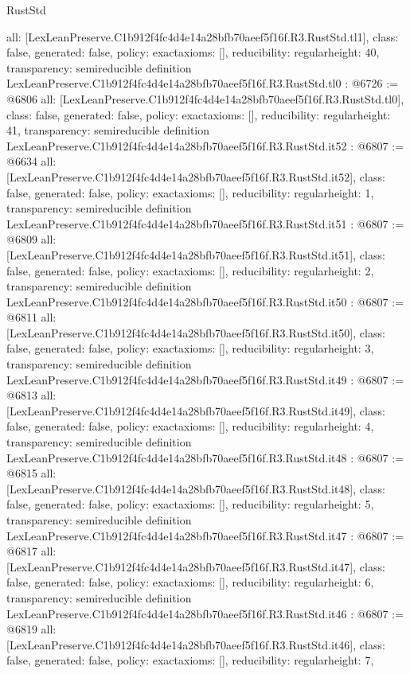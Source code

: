 \begin{lexlean}{RustStd}
\begin{coremodule}
{  all: [LexLeanPreserve.C1b912f4fc4d4e14a28bfb70aeef5f16f.R3.RustStd.tl1],
  class: false,
  generated: false,
  policy: exact{axioms: []},
  reducibility: regular{height: 40},
  transparency: semireducible
}
definition LexLeanPreserve.C1b912f4fc4d4e14a28bfb70aeef5f16f.R3.RustStd.tl0 : @6726 := @6806 {
  all: [LexLeanPreserve.C1b912f4fc4d4e14a28bfb70aeef5f16f.R3.RustStd.tl0],
  class: false,
  generated: false,
  policy: exact{axioms: []},
  reducibility: regular{height: 41},
  transparency: semireducible
}
definition LexLeanPreserve.C1b912f4fc4d4e14a28bfb70aeef5f16f.R3.RustStd.it52 : @6807 := @6634 {
  all: [LexLeanPreserve.C1b912f4fc4d4e14a28bfb70aeef5f16f.R3.RustStd.it52],
  class: false,
  generated: false,
  policy: exact{axioms: []},
  reducibility: regular{height: 1},
  transparency: semireducible
}
definition LexLeanPreserve.C1b912f4fc4d4e14a28bfb70aeef5f16f.R3.RustStd.it51 : @6807 := @6809 {
  all: [LexLeanPreserve.C1b912f4fc4d4e14a28bfb70aeef5f16f.R3.RustStd.it51],
  class: false,
  generated: false,
  policy: exact{axioms: []},
  reducibility: regular{height: 2},
  transparency: semireducible
}
definition LexLeanPreserve.C1b912f4fc4d4e14a28bfb70aeef5f16f.R3.RustStd.it50 : @6807 := @6811 {
  all: [LexLeanPreserve.C1b912f4fc4d4e14a28bfb70aeef5f16f.R3.RustStd.it50],
  class: false,
  generated: false,
  policy: exact{axioms: []},
  reducibility: regular{height: 3},
  transparency: semireducible
}
definition LexLeanPreserve.C1b912f4fc4d4e14a28bfb70aeef5f16f.R3.RustStd.it49 : @6807 := @6813 {
  all: [LexLeanPreserve.C1b912f4fc4d4e14a28bfb70aeef5f16f.R3.RustStd.it49],
  class: false,
  generated: false,
  policy: exact{axioms: []},
  reducibility: regular{height: 4},
  transparency: semireducible
}
definition LexLeanPreserve.C1b912f4fc4d4e14a28bfb70aeef5f16f.R3.RustStd.it48 : @6807 := @6815 {
  all: [LexLeanPreserve.C1b912f4fc4d4e14a28bfb70aeef5f16f.R3.RustStd.it48],
  class: false,
  generated: false,
  policy: exact{axioms: []},
  reducibility: regular{height: 5},
  transparency: semireducible
}
definition LexLeanPreserve.C1b912f4fc4d4e14a28bfb70aeef5f16f.R3.RustStd.it47 : @6807 := @6817 {
  all: [LexLeanPreserve.C1b912f4fc4d4e14a28bfb70aeef5f16f.R3.RustStd.it47],
  class: false,
  generated: false,
  policy: exact{axioms: []},
  reducibility: regular{height: 6},
  transparency: semireducible
}
definition LexLeanPreserve.C1b912f4fc4d4e14a28bfb70aeef5f16f.R3.RustStd.it46 : @6807 := @6819 {
  all: [LexLeanPreserve.C1b912f4fc4d4e14a28bfb70aeef5f16f.R3.RustStd.it46],
  class: false,
  generated: false,
  policy: exact{axioms: []},
  reducibility: regular{height: 7},
}
\end{coremodule}
\end{lexlean}
